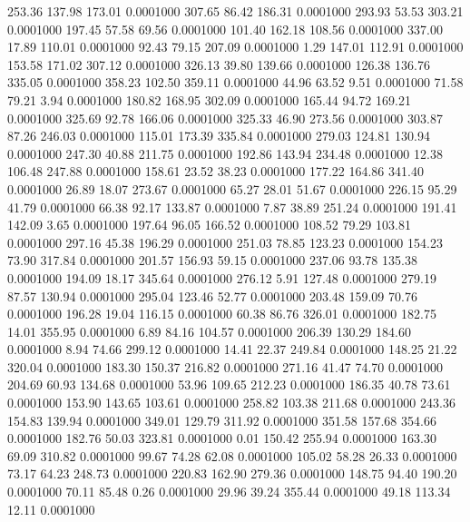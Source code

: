  253.36  137.98  173.01   0.0001000
 307.65   86.42  186.31   0.0001000
 293.93   53.53  303.21   0.0001000
 197.45   57.58   69.56   0.0001000
 101.40  162.18  108.56   0.0001000
 337.00   17.89  110.01   0.0001000
  92.43   79.15  207.09   0.0001000
   1.29  147.01  112.91   0.0001000
 153.58  171.02  307.12   0.0001000
 326.13   39.80  139.66   0.0001000
 126.38  136.76  335.05   0.0001000
 358.23  102.50  359.11   0.0001000
  44.96   63.52    9.51   0.0001000
  71.58   79.21    3.94   0.0001000
 180.82  168.95  302.09   0.0001000
 165.44   94.72  169.21   0.0001000
 325.69   92.78  166.06   0.0001000
 325.33   46.90  273.56   0.0001000
 303.87   87.26  246.03   0.0001000
 115.01  173.39  335.84   0.0001000
 279.03  124.81  130.94   0.0001000
 247.30   40.88  211.75   0.0001000
 192.86  143.94  234.48   0.0001000
  12.38  106.48  247.88   0.0001000
 158.61   23.52   38.23   0.0001000
 177.22  164.86  341.40   0.0001000
  26.89   18.07  273.67   0.0001000
  65.27   28.01   51.67   0.0001000
 226.15   95.29   41.79   0.0001000
  66.38   92.17  133.87   0.0001000
   7.87   38.89  251.24   0.0001000
 191.41  142.09    3.65   0.0001000
 197.64   96.05  166.52   0.0001000
 108.52   79.29  103.81   0.0001000
 297.16   45.38  196.29   0.0001000
 251.03   78.85  123.23   0.0001000
 154.23   73.90  317.84   0.0001000
 201.57  156.93   59.15   0.0001000
 237.06   93.78  135.38   0.0001000
 194.09   18.17  345.64   0.0001000
 276.12    5.91  127.48   0.0001000
 279.19   87.57  130.94   0.0001000
 295.04  123.46   52.77   0.0001000
 203.48  159.09   70.76   0.0001000
 196.28   19.04  116.15   0.0001000
  60.38   86.76  326.01   0.0001000
 182.75   14.01  355.95   0.0001000
   6.89   84.16  104.57   0.0001000
 206.39  130.29  184.60   0.0001000
   8.94   74.66  299.12   0.0001000
  14.41   22.37  249.84   0.0001000
 148.25   21.22  320.04   0.0001000
 183.30  150.37  216.82   0.0001000
 271.16   41.47   74.70   0.0001000
 204.69   60.93  134.68   0.0001000
  53.96  109.65  212.23   0.0001000
 186.35   40.78   73.61   0.0001000
 153.90  143.65  103.61   0.0001000
 258.82  103.38  211.68   0.0001000
 243.36  154.83  139.94   0.0001000
 349.01  129.79  311.92   0.0001000
 351.58  157.68  354.66   0.0001000
 182.76   50.03  323.81   0.0001000
   0.01  150.42  255.94   0.0001000
 163.30   69.09  310.82   0.0001000
  99.67   74.28   62.08   0.0001000
 105.02   58.28   26.33   0.0001000
  73.17   64.23  248.73   0.0001000
 220.83  162.90  279.36   0.0001000
 148.75   94.40  190.20   0.0001000
  70.11   85.48    0.26   0.0001000
  29.96   39.24  355.44   0.0001000
  49.18  113.34   12.11   0.0001000

